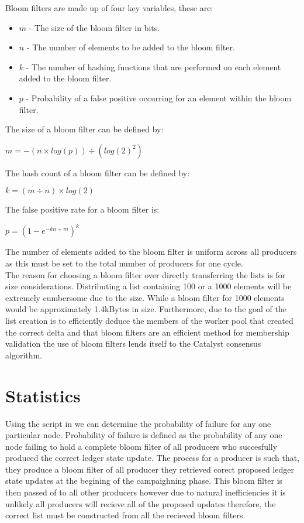\documentclass{article}
\begin{document}
Bloom filters are made up of four key variables, these are:

\begin{itemize} 
\item $m$ - The size of the bloom filter in bits.  
\item $n$ - The number of elements to be added to the bloom filter. 
\item $k$ - The number of hashing functions that are performed on each element added to the bloom filter. 
\item $p$ - Probability of a false positive occurring for an element within the bloom filter. 
\end{itemize} 

The size of a bloom filter can be defined by: 

\begin{center} 
$m = -(n \times log(p)) \div (log(2)^2)$
\end{center} 

The hash count of a bloom filter can be defined by:

\begin{center} 
$k = (m \div n) \times log(2)$
\end{center} 

The false positive rate for a bloom filter is: 

\begin{center} 
$p = (1 - e^{-kn \div m})^k$
\end{center} 

The number of elements added to the bloom filter is uniform across all producers as this must be set to the total number of producers for one cycle. \\

The reason for choosing a bloom filter over directly transferring the lists is for size considerations. Distributing a list containing 100 or a 1000 elements will be extremely cumbersome due to the size. While a bloom filter for 1000 elements would be approximately 1.4kBytes in size. Furthermore, due to the goal of the list creation is to efficiently deduce the members of the worker pool that created the correct delta and that bloom filters are an efficient method for membership validation the use of bloom filters lends itself to the Catalyst consensus algorithm. 

\section{Statistics}

Using the script in \cite{python} we can determine the probability of failure for any one particular node. Probability of failure is defined as the probability of any one node failing to hold a complete bloom filter of all producers who succesfully produced the correct ledger state update. The process for a producer is such that, they produce a bloom filter of all producer they retrieved corect proposed ledger state updates at the begining of the campaighning phase. This bloom filter is then passed of to all other producers however due to natural inefficiencies it is unlikely all producers will recieve all of the proposed updates therefore, the correct list must be constructed from all the recieved bloom filters. 
\end{document}
